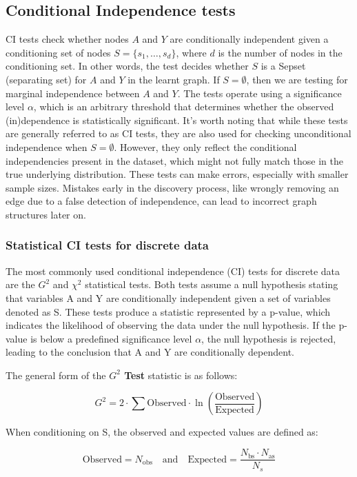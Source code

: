 \documentclass[main.tex]{subfiles}
\begin{document}
\subsection{Conditional Independence tests}
CI tests check whether nodes $A$ and $Y$ are conditionally independent given a conditioning set of nodes $S = \{s_1, \dots, s_d\}$, where $d$ is the number of nodes in the conditioning set. In other words, the test decides whether $S$ is a Sepset (separating set) for $A$ and $Y$ in the learnt graph. If $S = \emptyset$, then we are testing for marginal independence between $A$ and $Y$. The tests operate using a significance level $\alpha$, which is an arbitrary threshold that determines whether the observed (in)dependence is statistically significant. It's worth noting that while these tests are generally referred to as CI tests, they are also used for checking unconditional independence when $S = \emptyset$. However, they only reflect the conditional independencies present in the dataset, which might not fully match those in the true underlying distribution. These tests can make errors, especially with smaller sample sizes. Mistakes early in the discovery process, like wrongly removing an edge due to a false detection of independence, can lead to incorrect graph structures later on. 
\subsubsection*{Statistical CI tests for discrete data}
The most commonly used conditional independence (CI) tests for discrete data are the $ G^2 $ and $ \chi^2 $ statistical tests. Both tests assume a null hypothesis stating that variables A and Y are conditionally independent given a set of variables denoted as S. These tests produce a statistic represented by a p-value, which indicates the likelihood of observing the data under the null hypothesis. If the p-value is below a predefined significance level $ \alpha $, the null hypothesis is rejected, leading to the conclusion that A and Y are conditionally dependent.

The general form of the \textbf{$ G^2 $ Test} statistic is as follows:

\[
G^2 = 2 \cdot \sum \text{Observed} \cdot \ln \left( \frac{\text{Observed}}{\text{Expected}} \right)
\]

When conditioning on S, the observed and expected values are defined as:

\[
\text{Observed} = N_{\text{obs}} \quad \text{and} \quad \text{Expected} = \frac{N_{\text{bs}} \cdot N_{\text{as}}}{N_s}
\]
\end{document}
